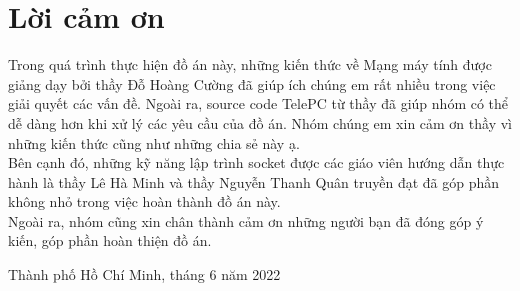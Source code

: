 \setcounter{secnumdepth}{0}
\section{Lời cảm ơn}
Trong quá trình thực hiện đồ án này, những kiến thức về Mạng máy tính được giảng dạy bởi thầy Đỗ Hoàng Cường đã giúp ích chúng em rất nhiều trong việc giải quyết các vấn đề. Ngoài ra, source code TelePC từ thầy đã giúp nhóm có thể dễ dàng hơn khi xử lý các yêu cầu của đồ án. Nhóm chúng em xin cảm ơn thầy vì những kiến thức cũng như những chia sẻ này ạ.\\
Bên cạnh đó, những kỹ năng lập trình socket được các giáo viên hướng dẫn thực hành là thầy Lê Hà Minh và thầy Nguyễn Thanh Quân truyền đạt đã góp phần không nhỏ trong việc hoàn thành đồ án này.\\
Ngoài ra, nhóm cũng xin chân thành cảm ơn những người bạn đã đóng góp ý kiến, góp phần hoàn thiện đồ án.
\begin{flushright}
Thành phố Hồ Chí Minh, tháng 6 năm 2022
\end{flushright}